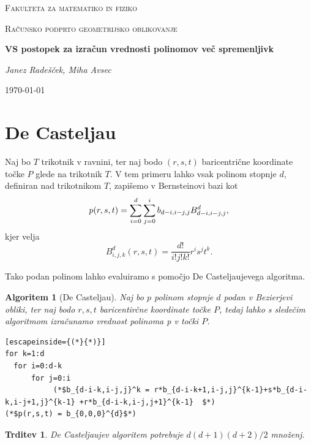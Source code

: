 \documentclass{article}
\newtheorem{algoritm}{Algoritem}[section]
\newtheorem{trditev}{Trditev}[section]
\begin{document}
\begin{titlepage}
	\centering
	{\scshape\LARGE Fakulteta za matematiko in fiziko \par}
	\vspace{1cm}
	{\scshape\Large Računsko podprto geometrijsko oblikovanje\par}
	\vspace{1.5cm}
	{\huge\bfseries VS postopek za izračun vrednosti polinomov več spremenljivk\par}
	\vspace{2cm}
	{\Large\itshape Janez Radešček, Miha Avsec\par}
	\vfill

	\vfill

	{\large \today\par}
\end{titlepage}


\section{De Casteljau}

Naj bo $T$ trikotnik v ravnini, ter naj bodo $(r,s,t)$ baricentrične koordinate točke $P$ glede na trikotnik $T$. V tem primeru lahko vsak polinom stopnje $d$, definiran nad trikotnikom $T$, zapišemo v Bernsteinovi bazi kot
$$p(r,\\s,\\t) = \sum_{i=0}^{d}\sum_{j=0}^{i}b_{d-i,i-j,j}B_{d-i,i-j,j}^{d},$$
kjer velja
$$B_{i,j,k}^{d}(r,s,t) = \frac{d!}{i!j!k!}r^{i}s^jt^k.$$

Tako podan polinom lahko evaluiramo s pomočjo De Casteljaujevega algoritma.
\begin{algoritm}[De Casteljau]
Naj bo $p$ polinom stopnje $d$ podan v Bezierjevi obliki, ter naj bodo $ r,s,t$ baricentirčne koordinate točke $P$, tedaj lahko s sledečim algoritmom izračunamo vrednost polinoma p v točki $P$.
\begin{lstlisting}[escapeinside={(*}{*)}]
for k=1:d
  for i=0:d-k
      for j=0:i
           (*$b_{d-i-k,i-j,j}^k = r*b_{d-i-k+1,i-j,j}^{k-1}+s*b_{d-i-k,i-j+1,j}^{k-1} +r*b_{d-i-k,i-j,j+1}^{k-1}  $*)
(*$p(r,s,t) = b_{0,0,0}^{d}$*)
\end{lstlisting}
\end{algoritm}

\begin{trditev}
\label{decast}
De Casteljaujev algoritem potrebuje $d(d+1)(d+2)/2$ množenj.
\end{trditev}
\end{document}
